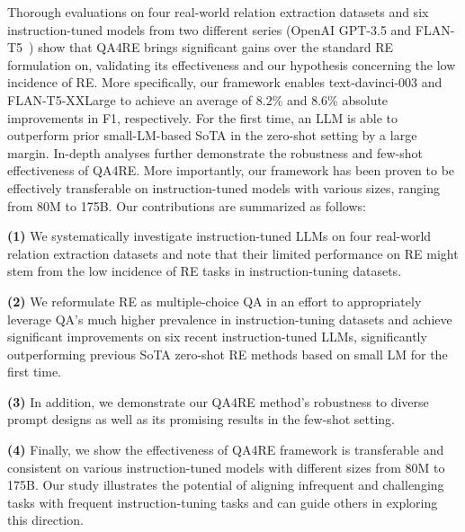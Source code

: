 Thorough evaluations on four real-world relation extraction datasets and six instruction-tuned models from two different series (OpenAI GPT-3.5 and FLAN-T5~\cite{ChungFlanT5}) show that QA4RE brings significant gains over the standard RE formulation on, validating its effectiveness and our hypothesis concerning the low incidence of RE.
More specifically, our framework enables text-davinci-003 and FLAN-T5-XXLarge to achieve an average of $8.2$\% and $8.6$\% absolute improvements in F1, respectively.
For the first time, an LLM is able to outperform prior small-LM-based SoTA in the zero-shot setting by a large margin.
In-depth analyses further demonstrate the robustness and few-shot effectiveness of QA4RE. 
More importantly, our framework has been proven to be effectively transferable on instruction-tuned models with various sizes, ranging from 80M to 175B.
Our contributions are summarized as follows:

\noindent
\textbf{(1)}
We systematically investigate instruction-tuned LLMs on four real-world relation extraction datasets and note that their limited performance on RE might stem from the low incidence of RE tasks in instruction-tuning datasets.

\noindent
\textbf{(2)}
We reformulate RE as multiple-choice QA in an effort to appropriately leverage QA's much higher prevalence in instruction-tuning datasets and achieve significant improvements on six recent instruction-tuned LLMs, significantly outperforming previous SoTA zero-shot RE methods based on small LM for the first time.

\noindent
\textbf{(3)}
In addition, we demonstrate our QA4RE method's robustness to diverse prompt designs as well as its promising results in the few-shot setting. 


\noindent
\textbf{(4)}
Finally, we show the effectiveness of QA4RE framework is transferable and consistent on various instruction-tuned models with different sizes from 80M to 175B.
Our study illustrates the potential of aligning infrequent and challenging tasks with frequent instruction-tuning tasks and can guide others in exploring this direction.






